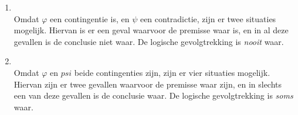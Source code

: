 \begin{answer}
\begin{enumerate}[label=\textit{\alph*.}]
\item{}\\
    Omdat $\varphi$ een contingentie is, en $\psi$ een contradictie, zijn er twee situaties mogelijk. Hiervan is er een geval waarvoor de premisse waar is, en in al deze gevallen is de conclusie niet waar. De logische gevolgtrekking is \emph{nooit} waar.

\item{}\\
    Omdat $\varphi$ en $psi$ beide contingenties zijn, zijn er vier situaties mogelijk. Hiervan zijn er twee gevallen waarvoor de premisse waar zijn, en in slechts een van deze gevallen is de conclusie waar. De logische gevolgtrekking is \emph{soms} waar.

\end{enumerate}
\end{answer}

